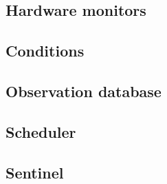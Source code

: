 \lipsum{}

\subsection{Hardware monitors}
\label{sec:autonomous-monitors}

\lipsum{}

\subsection{Conditions}
\label{sec:autonomous-conditions}

\lipsum{}

\subsection{Observation database}
\label{sec:autonomous-obsdb}

\lipsum{}

\subsection{Scheduler}
\label{sec:autonomous-scheduler}

\lipsum{}

\subsection{Sentinel}
\label{sec:autonomous-sentinel}

\lipsum{}

